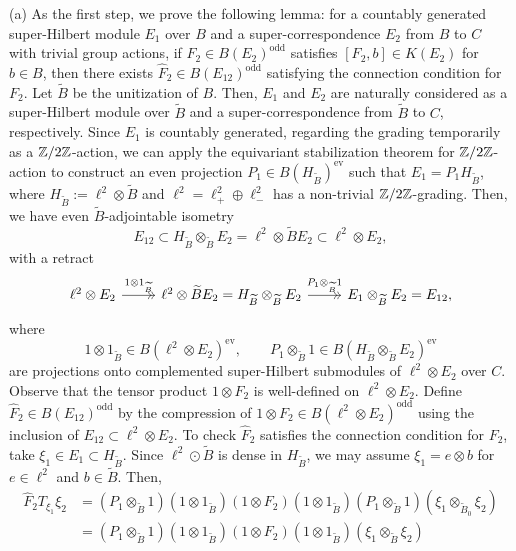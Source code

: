 \documentclass{../../large}
\begin{document}
\begin{pf}
(a)
As the first step, we prove the following lemma:
for a countably generated super-Hilbert module $E_1$ over $B$ and a super-correspondence $E_2$ from $B$ to $C$ with trivial group actions, if $F_2\in B(E_2)^{\mathrm{odd}}$ satisfies $[F_2,b]\in K(E_2)$ for $b\in B$, then there exists $\hat F_2\in B(E_{12})^{\mathrm{odd}}$ satisfying the connection condition for $F_2$.
Let $\tilde B$ be the unitization of $B$.
Then, $E_1$ and $E_2$ are naturally considered as a super-Hilbert module over $\tilde B$ and a super-correspondence from $\tilde B$ to $C$, respectively.
Since $E_1$ is countably generated, regarding the grading temporarily as a $\mathbb{Z}/2\mathbb{Z}$-action, we can apply the equivariant stabilization theorem for $\mathbb{Z}/2\mathbb{Z}$-action to construct an even projection $P_1\in B(H_{\tilde B})^{\mathrm{ev}}$ such that $E_1=P_1H_{\tilde B}$, where $H_{\tilde B}:=\ell^2\otimes\tilde B$ and $\ell^2=\ell^2_+\oplus\ell^2_-$ has a non-trivial $\mathbb{Z}/2\mathbb{Z}$-grading.
Then, we have even $\tilde B$-adjointable isometry
\[E_{12}\subset H_{\tilde B}\otimes_{\tilde B} E_2=\ell^2\otimes\tilde BE_2\subset\ell^2\otimes E_2,\]
with a retract
\[\begin{tikzcd}
\ell^2\otimes E_2 \rar[->>]{1\otimes1_{\tilde B}}&
\ell^2\otimes\tilde BE_2=
H_{\tilde B}\otimes_{\tilde B} E_2 \rar[->>]{P_1\otimes_{\tilde B}1}&
E_1\otimes_{\tilde B}E_2=
E_{12},
\end{tikzcd}\]
where
\[1\otimes1_{\tilde B}\in B(\ell^2\otimes E_2)^{\mathrm{ev}},\qquad P_1\otimes_{\tilde B}1\in B(H_{\tilde B}\otimes_{\tilde B}E_2)^{\mathrm{ev}}\]
are projections onto complemented super-Hilbert submodules of $\ell^2\otimes E_2$ over $C$.
Observe that the tensor product $1\otimes F_2$ is well-defined on $\ell^2\otimes E_2$.
Define $\hat F_2\in B(E_{12})^{\mathrm{odd}}$ by the compression of $1\otimes F_2\in B(\ell^2\otimes E_2)^{\mathrm{odd}}$ using the inclusion of $E_{12}\subset\ell^2\otimes E_2$.
To check $\hat F_2$ satisfies the connection condition for $F_2$, take $\xi_1\in E_1\subset H_{\tilde B}$.
Since $\ell^2\odot\tilde B$ is dense in $H_{\tilde B}$, we may assume $\xi_1=e\otimes b$ for $e\in\ell^2$ and $b\in\tilde B$.
Then,
\begin{align*}
\hat F_2T_{\xi_1}\xi_2
&=(P_1\otimes_{\tilde B}1)(1\otimes1_{\tilde B})(1\otimes F_2)(1\otimes1_{\tilde B})(P_1\otimes_{\tilde B}1)(\xi_1\otimes_{\tilde B_0}\xi_2)\\
&=(P_1\otimes_{\tilde B}1)(1\otimes1_{\tilde B})(1\otimes F_2)(1\otimes1_{\tilde B})(\xi_1\otimes_{\tilde B}\xi_2)\\

\end{align*}
\end{pf}
\end{document}
